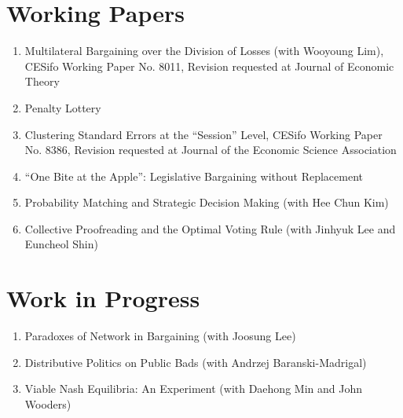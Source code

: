 \documentclass[margin, letterpaper]{res}
\begin{document}
\begin{resume}
\section{Working Papers}
\begin{enumerate}
\item Multilateral Bargaining over the Division of Losses (with Wooyoung Lim), CESifo Working Paper No. 8011, Revision requested at Journal of Economic Theory
\item Penalty Lottery
\item Clustering Standard Errors at the ``Session'' Level, CESifo Working Paper No. 8386, Revision requested at Journal of the Economic Science Association
\item ``One Bite at the Apple'': Legislative Bargaining without Replacement
\item Probability Matching and Strategic Decision Making (with Hee Chun Kim)
\item Collective Proofreading and the Optimal Voting Rule (with Jinhyuk Lee and Euncheol Shin)
\end{enumerate}

\section{Work in Progress}
\begin{enumerate}
\item Paradoxes of Network in Bargaining (with Joosung Lee)
\item Distributive Politics on Public Bads (with Andrzej Baranski-Madrigal)
\item Viable Nash Equilibria: An Experiment (with Daehong Min and John Wooders)
\end{enumerate}


\end{resume}
\end{document}
